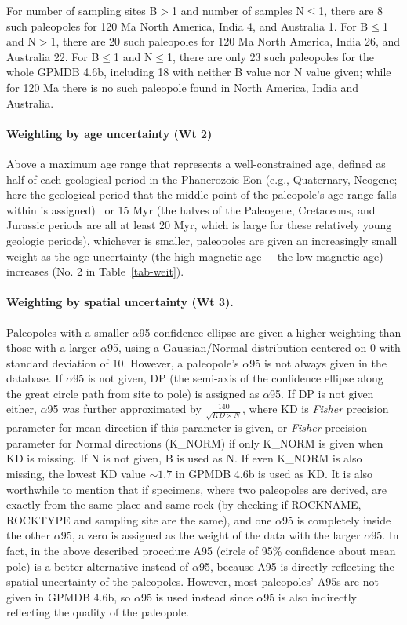For number of sampling sites B$>$1 and number of samples N$\leq$1, there are 8
such paleopoles for 120 Ma North America, India 4, and Australia 1.
For B$\leq$1 and N$>$1, there are 20 such paleopoles for 120 Ma
North America, India 26, and Australia 22. For B$\leq$1 and N$\leq$1, there are
only 23 such paleopoles for the whole GPMDB 4.6b, including 18 with neither B
value nor N value given; while for 120 Ma there is no such paleopole
found in North America, India and Australia.

\paragraph{Weighting by age uncertainty (Wt 2)} Above a maximum age range
that represents a well-constrained age, defined as half of each geological
period in the Phanerozoic Eon (e.g., Quaternary, Neogene; here the geological
period that the middle point of the paleopole's age range falls within is
assigned)~\citep{v90,T20} or 15 Myr (the halves of the Paleogene, Cretaceous,
and Jurassic periods are all at least 20 Myr, which is large for these
relatively young geologic periods), whichever is smaller, paleopoles are given
an increasingly small weight as the age uncertainty (the high magnetic age $-$
the low magnetic age) increases (No. 2 in Table~\ref{tab-weit}).

\paragraph{Weighting by spatial uncertainty (Wt 3).} Paleopoles with a
smaller $\alpha$95 confidence ellipse are given a higher weighting than those
with a larger $\alpha$95, using a Gaussian/Normal distribution centered on 0
with standard deviation of 10. However, a paleopole's $\alpha$95 is not always
given in the database. If $\alpha$95 is not given, DP (the semi-axis of the
confidence ellipse along the great circle path from site to pole) is assigned as
$\alpha$95. If DP is not given either, $\alpha$95 was further approximated by
$\frac{140}{\sqrt{KD\times{}N}}$, where KD is \emph{Fisher} precision parameter for
mean direction if this parameter is given, or \emph{Fisher} precision parameter for
Normal directions (K\_NORM) if only K\_NORM is given when KD is missing. If N is
not given, B is used as N. If even K\_NORM is also missing, the lowest KD value
${\sim}1.7$ in GPMDB 4.6b is used as KD\@. It is also worthwhile to mention that
if specimens, where two paleopoles are derived, are exactly from the same place
and same rock (by checking if ROCKNAME, ROCKTYPE and sampling site are the
same), and one $\alpha$95 is completely inside the other $\alpha$95, a zero is
assigned as the weight of the data with the larger $\alpha$95. In fact, in the
above described procedure A95 (circle of 95\% confidence about mean pole) is a
better alternative instead of $\alpha$95, because A95 is directly reflecting the
spatial uncertainty of the paleopoles. However, most paleopoles' A95s are not
given in GPMDB 4.6b, so $\alpha$95 is used instead since $\alpha$95 is also
indirectly reflecting the quality of the paleopole.

